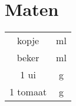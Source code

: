 \section{Maten}

\begin{tabular}{|c|c|}
    \hline
    \unit[1]{kopje} & \unit[125]{ml} \\
    \unit[1]{beker} & \unit[180]{ml} \\
    1 ui &  \unit[75]{g} \\
    1 tomaat & \unit[70]{g} \\
    \hline
\end{tabular}
